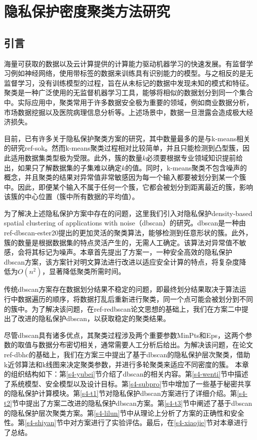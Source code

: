 \chapter{隐私保护密度聚类方法研究}
\section{引言}
海量可获取的数据以及云计算提供的计算能力驱动机器学习的快速发展。有监督学习例如神经网络，使用带标签的数据来训练具有识别能力的模型。与之相反的是无监督学习，没有训练模型的过程，旨在从未标记的数据中发现未知的模式和特征。聚类是一种广泛使用的无监督机器学习工具，能够将相似的数据划分到同一个集合中。实际应用中，聚类常用于许多数据安全极为重要的领域，例如商业数据分析，市场数据挖掘以及医院病理信息分析等。上述场景中，数据一旦泄露会造成极大经济损失。

目前，已有许多关于隐私保护聚类方案的研究，其中数量最多的是与k-means相关的研究ref-sok。然而k-means聚类过程相对比较简单，并且只能检测到凸型簇，因此适用数据集类型极为受限。此外，簇的数量$k$必须要根据专业领域知识提前给出，如果只了解数据集的子集难以确定$k$的值。同时，k-means聚类不包含噪声的概念，并且聚类的结果对异常值非常敏感因为每一个输入都要被划分到某一个簇中。因此，即便某个输入不属于任何一个簇，它都会被划分到距离最近的簇，影响该簇的中心位置（簇中所有数据的平均值）。

为了解决上述隐私保护方案中存在的问题，这里我们引入对隐私保护density-based spatial clustering of applications with noise（dbscan）的研究。dbscan是一种由ref-dbscan-ester20提出的更加灵活的聚类算法，能够检测到任意形状的簇。此外，簇的数量是根据数据集的特点灵活产生的，无需人工确定。该算法对异常值不敏感，会将其标记为噪声。本章首先提出了方案一，一种安全高效的隐私保护dbscan方案，该方案针对明文算法进行改进以适应安全计算的特点，将复杂度降低为$O(n^2)$，显著降低聚类所需时间。

传统dbscan方案存在数据划分结果不稳定的问题，即最终划分结果取决于算法运行中数据遍历的顺序，将数据打乱后重新进行聚类，同一个点可能会被划分到不同的簇中。为了解决该问题，在ref-redbscan论文思想的基础上，我们在方案二中提出了改进的隐私保护dbscan，以获取稳定的聚类结果。

尽管dbscan具有诸多优点，其聚类过程涉及两个重要参数MinPts和Eps，这两个参数的取值与数据分布密切相关，通常需要人工分析后给出。为解决该问题，在论文ref-dbhc的基础上，我们在方案三中提出了基于dbscan的隐私保护层次聚类，借助k近邻算法和k线图来决定聚类参数，并进行多轮聚类来适应不同密度的簇。
本章的组织结构如下：第\ref{s4-yubei}节介绍了dbscan的相关内容。第\ref{s4-wenti}节中描述了系统模型、安全模型以及设计目标。第\ref{s4-subpro}节中增加了一些基于秘密共享的隐私保护计算模块。第\ref{s4-t1}节对隐私保护dbscan方案进行了详细介绍。第\ref{s4-t2}节中提出了方案二改进的隐私保护dbscan方案。第\ref{s4-t3}节中阐述了基于dbscan的隐私保护层次聚类方案。第\ref{s4-lilun}节中从理论上分析了方案的正确性和安全性。第\ref{s4-shiyan}节中对方案进行了实验评估。最后，在\ref{s4-xiaojie}节对本章进行了总结。
\textbf{}
